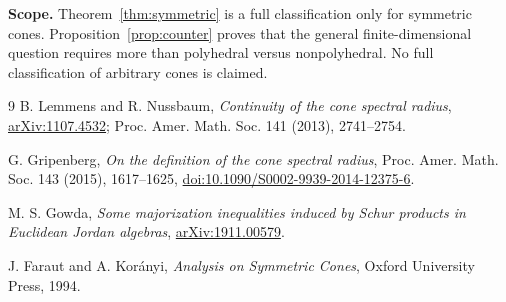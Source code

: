 \documentclass[10pt]{article}
\begin{document}
\textbf{Scope.} Theorem~\ref{thm:symmetric} is a full classification only for
symmetric cones.  Proposition~\ref{prop:counter} proves that the general
finite-dimensional question requires more than polyhedral versus
nonpolyhedral.  No full classification of arbitrary cones is claimed.

\begin{thebibliography}{9}
B. Lemmens and R. Nussbaum,
\emph{Continuity of the cone spectral radius},
\href{https://arxiv.org/abs/1107.4532}{arXiv:1107.4532};
Proc. Amer. Math. Soc. 141 (2013), 2741--2754.

G. Gripenberg,
\emph{On the definition of the cone spectral radius},
Proc. Amer. Math. Soc. 143 (2015), 1617--1625,
\href{https://doi.org/10.1090/S0002-9939-2014-12375-6}{doi:10.1090/S0002-9939-2014-12375-6}.

M. S. Gowda,
\emph{Some majorization inequalities induced by Schur products in Euclidean
Jordan algebras},
\href{https://arxiv.org/abs/1911.00579}{arXiv:1911.00579}.

J. Faraut and A. Kor\'anyi,
\emph{Analysis on Symmetric Cones}, Oxford University Press, 1994.
\end{thebibliography}
\end{document}
